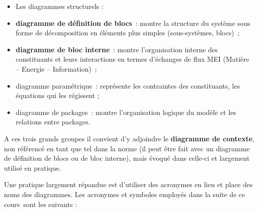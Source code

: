 \begin{itemize}
\item
  Les diagrammes structurels :
\end{itemize}

\begin{itemize}
\item
  \textbf{diagramme de définition de blocs}~: montre la structure du
  système sous forme de décomposition en éléments plus simples
  (sous-systèmes, blocs)~;
\item
  \textbf{diagramme de bloc interne}~: montre l'organisation interne des
  constituants et leurs interactions en termes d'échanges de flux MEI
  (Matière -- Energie -- Information)~;
\item
  diagramme paramétrique~: représente les contraintes des constituants,
  les équations qui les régissent ;
\item
  diagramme de packages~: montre l'organisation logique du modèle et les
  relations entre packages.
\end{itemize}

A ces trois grands groupes il convient d'y adjoindre le
\textbf{diagramme de contexte}, non référencé en tant que tel dans la
norme (il peut être fait avec un diagramme de définition de blocs ou de
bloc interne), mais évoqué dans celle-ci et largement utilisé en
pratique.

Une pratique largement répandue est d'utiliser des acronymes en lieu et
place des noms des diagrammes. Les acronymes et symboles employés dans
la suite de ce cours~sont les suivants :

